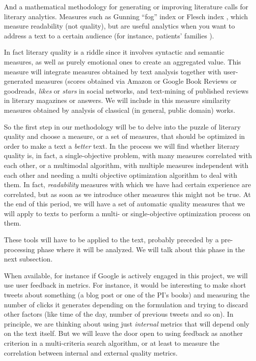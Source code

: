 \documentclass[a4paper,12pt,twocolumn]{article}
\begin{document}
And a mathematical methodology for generating or improving literature
calls for literary analytics. Measures such as Gunning ``fog'' index
\cite{gunning1969fog} or Flesch index \cite{roberts1994effects}, which
measure readability (not quality), but are useful analytics when you
want to address a text to a certain audience (for instance, patients'
families \cite{grossman1994informed}). 

In fact literary quality is a riddle since it involves syntactic and
semantic measures, as well as purely emotional ones to create an aggregated value. This
  measure will integrate measures obtained by text analysis together
  with user-generated measures (scores obtained via Amazon or Google
  Book Reviews or goodreads, {\em likes} or {\em stars} in social
  networks, and text-mining of published reviews in literary magazines
  or answers. We will include in this measure similarity measures
  obtained by analysis of classical (in general, public domain)
  works. 

So the first step in our methodology will be to delve into the puzzle
of literary quality and choose a measure, or a set of measures, that
should be optimized in order to make a text a {\em better} text. In
the process we will find whether literary quality is, in fact, a
single-objective problem, with many measures correlated with each
other, or a multimodal algorithm, with multiple measures independent
with each other and needing a multi objective optimization algorithm to
deal with them. In fact, {\em readability} measures with which we have
had certain experience are correlated, but as soon as we introduce
other measures this might not be true. At the end of this period, we
will have a set of automatic quality measures that we will apply to
texts to perform a multi- or single-objective optimization process on
them. 

These tools will have to be applied to the text, probably preceded by
a pre-processing phase where it will be analyzed. We will talk about
this phase in the next subsection.

When available, for instance if Google is actively engaged in this
project, we will use user feedback in metrics. For instance, it would
be interesting to make short tweets about something (a blog post or
one of the PI's books) and measuring the number of clicks it generates
depending on the formulation and trying to discard other factors (like
time of the day, number of previous tweets and so on). In principle,
we are thinking about using just {\em internal} metrics that will
depend only on the text itself. But we will leave the door open to
using feedback as another criterion in a multi-criteria search
algorithm, or at least to measure the correlation between internal and
external quality metrics. 
\end{document}
